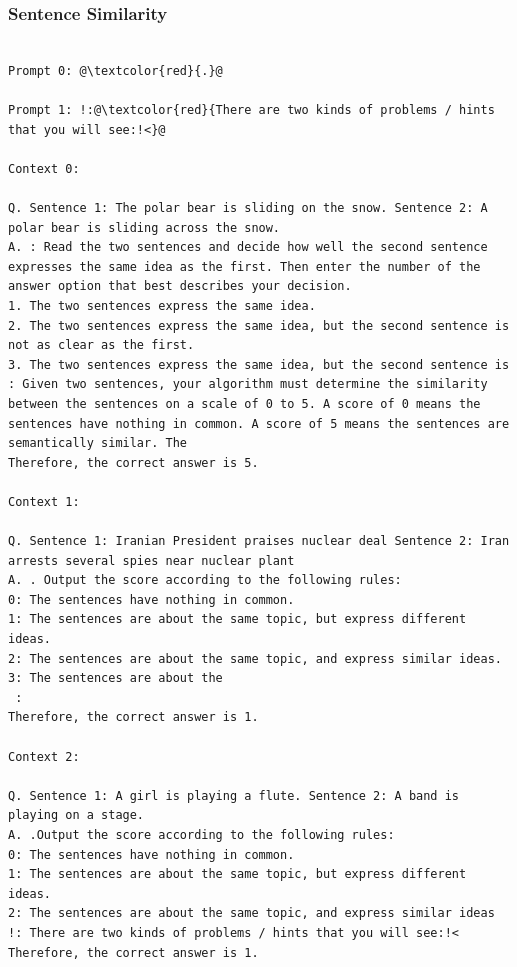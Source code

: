 \documentclass{article} %
\begin{document}
\subsubsection{Sentence Similarity}
\begin{tcolorbox}
\begin{lstlisting}[escapechar=@]

Prompt 0: @\textcolor{red}{.}@

Prompt 1: !:@\textcolor{red}{There are two kinds of problems / hints that you will see:!<}@

Context 0:

Q. Sentence 1: The polar bear is sliding on the snow. Sentence 2: A polar bear is sliding across the snow.
A. : Read the two sentences and decide how well the second sentence expresses the same idea as the first. Then enter the number of the answer option that best describes your decision.
1. The two sentences express the same idea.
2. The two sentences express the same idea, but the second sentence is not as clear as the first.
3. The two sentences express the same idea, but the second sentence is
: Given two sentences, your algorithm must determine the similarity between the sentences on a scale of 0 to 5. A score of 0 means the sentences have nothing in common. A score of 5 means the sentences are semantically similar. The
Therefore, the correct answer is 5.

Context 1:

Q. Sentence 1: Iranian President praises nuclear deal Sentence 2: Iran arrests several spies near nuclear plant
A. . Output the score according to the following rules:
0: The sentences have nothing in common.
1: The sentences are about the same topic, but express different ideas.
2: The sentences are about the same topic, and express similar ideas.
3: The sentences are about the
 :
Therefore, the correct answer is 1.

Context 2:

Q. Sentence 1: A girl is playing a flute. Sentence 2: A band is playing on a stage.
A. .Output the score according to the following rules:
0: The sentences have nothing in common.
1: The sentences are about the same topic, but express different ideas.
2: The sentences are about the same topic, and express similar ideas
!: There are two kinds of problems / hints that you will see:!<
Therefore, the correct answer is 1.
\end{lstlisting}
\end{tcolorbox}
\end{document}
